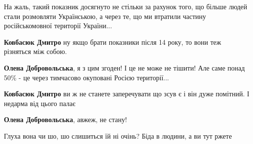 На жаль, такий показник досягнуто не стільки за рахунок того, що більше людей
стали розмовляти Українською, а через те, що ми втратили частину
російськомовної території України...

\begin{itemize}
 
\textbf{Ковбасюк Дмитро} ну якщо брати показники після 14 року, то вони теж різняться між собою.

 
\textbf{Олена Добровольська}, я з цим згоден! І це не може не тішити! Але саме
понад 50\% - це через тимчасово окуповані Росією території...

 
\textbf{Ковбасюк Дмитро} ви ж не станете заперечувати що зсув є і він дуже помітний. І недарма від цього палає

 
\textbf{Олена Добровольська}, авжеж, не стану!
\end{itemize}

 
Глуха вона чи шо, шо слишиться їй ні очінь? Біда в людини, а ви тут ржете


 

